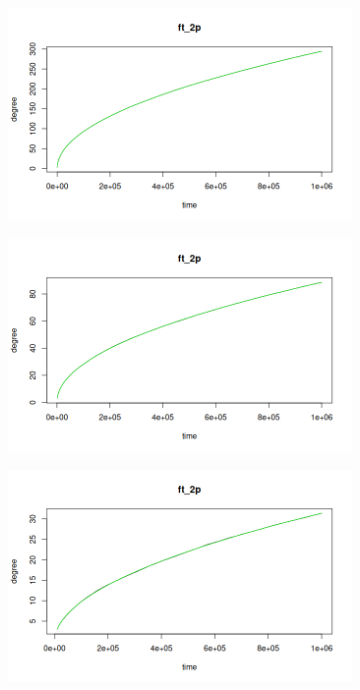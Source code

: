 \begin{figure}[ht]
\begin{subfigure}{.5\textwidth}
  \includegraphics[width=\linewidth]{figures/scaling_fits/fit_ba_2.png}
\end{subfigure}%
\begin{subfigure}{.5\textwidth}
  \centering
  \includegraphics[width=\linewidth]{figures/scaling_fits/fit_ba_3.png}
\end{subfigure}
\begin{subfigure}{.5\textwidth}
  \centering
  \includegraphics[width=\linewidth]{figures/scaling_fits/fit_ba_4.png}

\end{subfigure}
\end{figure}
